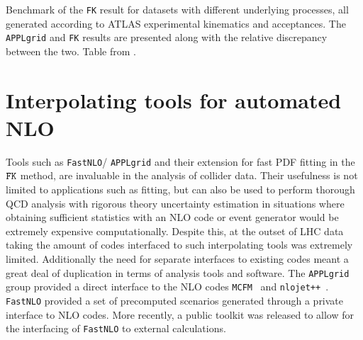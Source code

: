 \begin{table}[ht!]
\begin{center}
 \end{center}
\caption[Benchmark of the {\tt FK} result for datasets with different underlying processes]{ Benchmark of the {\tt FK} result for datasets with different underlying processes, all generated according to ATLAS experimental kinematics and acceptances. The { \tt APPLgrid} and {\tt FK} results are presented along with the relative discrepancy between the two. Table from \cite{Ball:2012cx}.\label{tab:fkbenchatlasjet} }
\end{table}


%

%
%

\section{Interpolating tools for automated NLO}
Tools such as { \tt FastNLO}/{ \tt APPLgrid} and their extension for fast PDF fitting in the $\tt FK$ method, are invaluable in the analysis of collider data. Their usefulness is not limited to applications such as fitting, but can also be used to perform thorough QCD analysis with rigorous theory uncertainty estimation in situations where obtaining sufficient statistics with an NLO code or event generator would be extremely expensive computationally. Despite this, at the outset of LHC data taking the amount of codes interfaced to such interpolating tools was extremely limited. Additionally the need for separate interfaces to existing codes meant a great deal of duplication in terms of analysis tools and software.  The { \tt APPLgrid} group provided a direct interface to the NLO codes {\tt MCFM}~\cite{Campbell:2000bg} and {\tt nlojet++}~\cite{Nagy:2001fj,Nagy:2003tz}. { \tt FastNLO} provided a set of precomputed scenarios generated through a private interface to NLO codes. More recently, a public toolkit was released to allow for the interfacing of { \tt FastNLO} to external calculations. 

